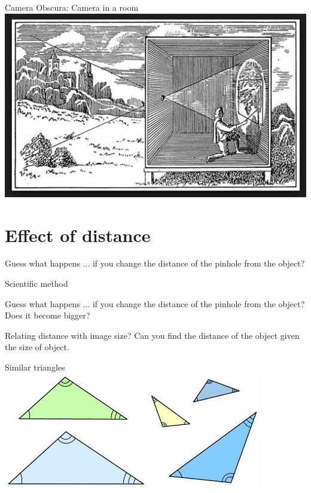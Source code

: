 \begin{frame}{Camera Obscura: Camera in a room}
  \centering
  \includegraphics[width=\textwidth]{media/camera_ina_room.jpg}
\end{frame}

\section{Effect of distance}
\begin{frame}{Guess what happens}
  ... if you change the distance of the pinhole from the object?
\end{frame}

\begin{frame}[fragile]{Scientific method}
  
\end{frame}

\begin{frame}{Guess what happens}
  ... if you change the distance of the pinhole from the object?\\
  \pause
  {\color{red} Does it become bigger?}
\end{frame}

\begin{frame}{Relating distance with image size?}
  Can you find the distance of the object given the size of object.
\end{frame}

\begin{frame}{Similar triangles}
  \includegraphics[width=\textwidth]{media/tri-similar1.png}
\end{frame}

